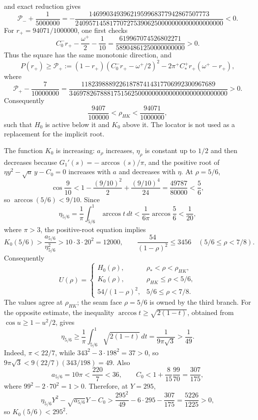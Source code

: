 \documentclass[11pt]{article}
\numberwithin{equation}{section}
\theoremstyle{definition}
\theoremstyle{remark}
\begin{document}
and exact reduction gives
\[
 \mathcal P_-+\frac1{5000000}
 =-\frac{14699034939621959968377942867507773}
 {2409571458177072753906250000000000000000000}<0.
\]
For \(r_+=94071/1000000\), one first checks
\[
 C_0^-r_+-\frac{\omega^+}{2}-\frac1{10}
 =\frac{619967074526802271}
 {58904861250000000000}>0.
\]
Thus the square has the same monotonic direction, and
\[
 P(r_+)\geq\mathcal P_+:=
 (1-r_+)(C_0^-r_+-\omega^+/2)^2
 -2\pi^+C_*^+r_+(\omega^+-r_+),
\]
where
\[
 \mathcal P_+-\frac7{10000000}
 =\frac{118239888922618787414317706992300967689}
 {3469782678881751562500000000000000000000000000}>0.
\]
Consequently
\[
 \frac{9407}{100000}<\rho_{HK}<\frac{94071}{1000000},
\]
such that \(H_0\) is active below it and \(K_0\) above it.  The locator
is not used as a replacement for the implicit root.

The function \(K_0\) is increasing: \(a_\rho\) increases,
\(\eta_\rho\) is constant up to \(1/2\) and then decreases because
\(G_1'(s)=-\arccos(s)/\pi\), and the positive root of
\(\eta y^2-\sqrt a\,y-C_0=0\) increases with \(a\) and decreases with
\(\eta\).  At \(\rho=5/6\),
\[
 \cos\frac9{10}
 <1-\frac{(9/10)^2}{2}+\frac{(9/10)^4}{24}
 =\frac{49787}{80000}<\frac56,
\]
so \(\arccos(5/6)<9/10\).  Since
\[
 \eta_{5/6}=\frac1\pi\int_{5/6}^1\arccos t\,dt
 <\frac1{6\pi}\arccos\frac56<\frac1{20},
\]
where \(\pi>3\), the positive-root equation implies
\[
 K_0(5/6)>\frac{a_{5/6}}{\eta_{5/6}^2}
 >10\cdot3\cdot20^2=12000,
 \qquad
 \frac{54}{(1-\rho)^2}\leq3456
 \quad(5/6\leq\rho<7/8).
\]
Consequently
\begin{equation}
 U(\rho)=
 \begin{cases}
 H_0(\rho),&\rho_*<\rho<\rho_{HK},\\
 K_0(\rho),&\rho_{HK}\leq\rho<5/6,\\
 54/(1-\rho)^2,&5/6\leq\rho<7/8.
 \end{cases}
 \label{cm:eq-U-piecewise}
\end{equation}
The values agree at \(\rho_{HK}\); the seam face \(\rho=5/6\) is
owned by the third branch.  For the opposite estimate, the inequality
\(\arccos t\geq\sqrt{2(1-t)}\), obtained from
\(\cos u\geq1-u^2/2\), gives
\[
 \eta_{5/6}\geq\frac1\pi\int_{5/6}^1\sqrt{2(1-t)}\,dt
 =\frac1{9\pi\sqrt3}>\frac1{49}.
\]
Indeed, \(\pi<22/7\), while
\(343^2-3\cdot198^2=37>0\), so
\(9\pi\sqrt3<9(22/7)(343/198)=49\).
Also
\[
 a_{5/6}=10\pi<\frac{220}{7}<36,\qquad
 C_0<1+\frac8{15}\frac{99}{70}=\frac{307}{175},
\]
where \(99^2-2\cdot70^2=1>0\).  Therefore, at \(Y=295\),
\[
 \eta_{5/6}Y^2-\sqrt{a_{5/6}}Y-C_0
 >\frac{295^2}{49}-6\cdot295-\frac{307}{175}
 =\frac{5226}{1225}>0,
\]
so \(K_0(5/6)<295^2\).
\end{document}
